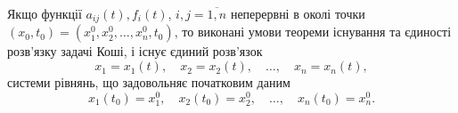 Якщо функції $a_{ij}(t), f_i(t)$, $i,j=\overline{1,n}$ неперервні в околі точки $(x_0, t_0) = (x_1^0, x_2^0, \ldots, x_n^0, t_0)$, то виконані умови теореми існування та єдиності розв'язку задачі Коші, і існує єдиний розв'язок
\begin{equation*}
	x_1 = x_1(t), \quad x_2 = x_2(t), \quad \ldots, \quad x_n = x_n(t),
\end{equation*}
системи рівнянь, що задовольняє початковим даним
 \begin{equation*}
	x_1(t_0) = x_1^0, \quad x_2(t_0) = x_2^0, \quad \ldots, \quad x_n(t_0) = x_n^0.
\end{equation*}
